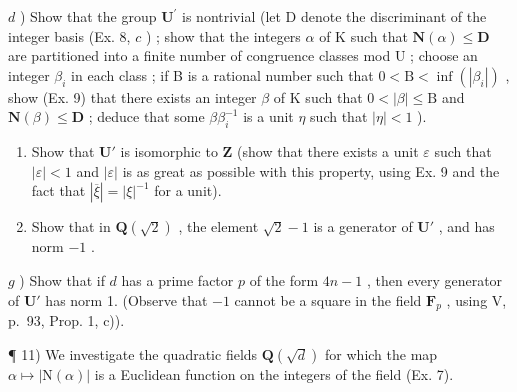 \(d\) ) Show that the group \(\mathbf{U}^{\prime}\) is nontrivial (let D denote the discriminant of the integer basis (Ex. 8, \(c\) ) ; show that the integers \(\alpha\) of K such that \(\mathbf{N}(\alpha)\leqslant \mathbf{D}\) are partitioned into a finite number of congruence classes mod U ; choose an integer \(\beta_{i}\) in each class ; if B is a rational number such that \(0 < \mathrm{B} < \inf (|\beta_i|)\) , show (Ex. 9) that there exists an integer \(\beta\) of K such that \(0 < |\beta |\leqslant \mathrm{B}\) and \(\mathbf{N}(\beta)\leqslant \mathbf{D}\) ; deduce that some \(\beta \beta_{i}^{-1}\) is a unit \(\eta\) such that \(|\eta| < 1\) ).

\begin{enumerate}
\def\labelenumi{\alph{enumi})}
\setcounter{enumi}{4}
\item
  Show that \(\mathbf{U}'\) is isomorphic to \(\mathbf{Z}\) (show that there exists a unit \(\varepsilon\) such that \(|\varepsilon| < 1\) and \(|\varepsilon|\) is as great as possible with this property, using Ex. 9 and the fact that \(|\overline{\xi}| = |\xi|^{-1}\) for a unit).
\item
  Show that in \(\mathbf{Q}(\sqrt{2})\) , the element \(\sqrt{2} - 1\) is a generator of \(\mathbf{U}'\) , and has norm \(-1\) .
\end{enumerate}

\(g\) ) Show that if \(d\) has a prime factor \(p\) of the form \(4n - 1\) , then every generator of \(\mathbf{U}'\) has norm 1. (Observe that \(-1\) cannot be a square in the field \(\mathbf{F}_p\) , using V, p.~93, Prop. 1, c)).

¶ 11) We investigate the quadratic fields \(\mathbf{Q}(\sqrt{d})\) for which the map \(\alpha \mapsto |\mathrm{N}(\alpha)|\) is a Euclidean function on the integers of the field (Ex. 7).

